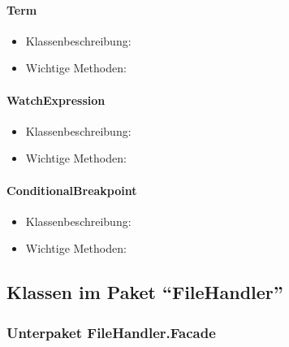 \documentclass[parskip=full]{scrartcl}
\begin{document}
\paragraph{Term}
\begin{itemize}
\item Klassenbeschreibung: \\

\item Wichtige Methoden:\\


\end{itemize}
\paragraph{WatchExpression}
\begin{itemize}
\item Klassenbeschreibung: \\

\item Wichtige Methoden:\\


\end{itemize}
\paragraph{ConditionalBreakpoint}
\begin{itemize}
\item Klassenbeschreibung: \\

\item Wichtige Methoden:\\


\end{itemize}

\subsection{Klassen im Paket \enquote{FileHandler}}

\subsubsection{Unterpaket FileHandler.Facade}
\end{document}
